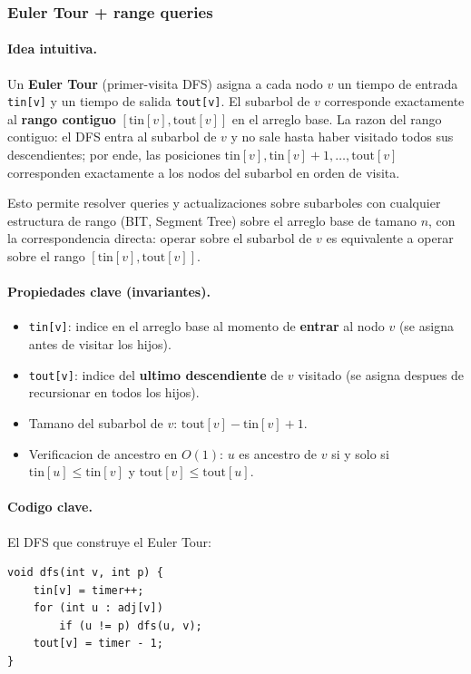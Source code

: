\subsubsection{Euler Tour + range queries}

\paragraph{Idea intuitiva.}
Un \textbf{Euler Tour} (primer-visita DFS) asigna a cada nodo $v$ un tiempo de entrada \texttt{tin[v]} y un tiempo de salida \texttt{tout[v]}. El subarbol de $v$ corresponde exactamente al \textbf{rango contiguo} $[\text{tin}[v], \text{tout}[v]]$ en el arreglo base. La razon del rango contiguo: el DFS entra al subarbol de $v$ y no sale hasta haber visitado todos sus descendientes; por ende, las posiciones $\text{tin}[v], \text{tin}[v]+1, \dots, \text{tout}[v]$ corresponden exactamente a los nodos del subarbol en orden de visita.

Esto permite resolver queries y actualizaciones sobre subarboles con cualquier estructura de rango (BIT, Segment Tree) sobre el arreglo base de tamano $n$, con la correspondencia directa: operar sobre el subarbol de $v$ es equivalente a operar sobre el rango $[\text{tin}[v], \text{tout}[v]]$.

\paragraph{Propiedades clave (invariantes).}
\begin{itemize}\setlength\itemsep{0pt}
	\item \texttt{tin[v]}: indice en el arreglo base al momento de \textbf{entrar} al nodo $v$ (se asigna antes de visitar los hijos).
	\item \texttt{tout[v]}: indice del \textbf{ultimo descendiente} de $v$ visitado (se asigna despues de recursionar en todos los hijos).
	\item Tamano del subarbol de $v$: $\text{tout}[v] - \text{tin}[v] + 1$.
	\item Verificacion de ancestro en $O(1)$: $u$ es ancestro de $v$ si y solo si $\text{tin}[u] \le \text{tin}[v]$ y $\text{tout}[v] \le \text{tout}[u]$.
\end{itemize}

\paragraph{Codigo clave.}
El DFS que construye el Euler Tour:
\begin{verbatim}
void dfs(int v, int p) {
    tin[v] = timer++;
    for (int u : adj[v])
        if (u != p) dfs(u, v);
    tout[v] = timer - 1;
}
\end{verbatim}

